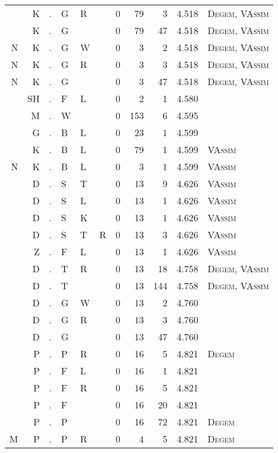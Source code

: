 \begin{longtable}{r@{ } r@{ } c@{ } l@{ } l@{ } l@{ } r r r r l }
  & K & . & G & R &   & 0 & 79 & 3 & 4.518 & \textsc{Degem}, \textsc{VAssim} \\
  & K & . & G &   &   & 0 & 79 & 47 & 4.518 & \textsc{Degem}, \textsc{VAssim} \\
N & K & . & G & W &   & 0 & 3 & 2 & 4.518 & \textsc{Degem}, \textsc{VAssim} \\
N & K & . & G & R &   & 0 & 3 & 3 & 4.518 & \textsc{Degem}, \textsc{VAssim} \\
N & K & . & G &   &   & 0 & 3 & 47 & 4.518 & \textsc{Degem}, \textsc{VAssim} \\
  & SH & . & F & L &   & 0 & 2 & 1 & 4.580 &  \\
  & M & . & W &   &   & 0 & 153 & 6 & 4.595 &  \\
  & G & . & B & L &   & 0 & 23 & 1 & 4.599 &  \\
  & K & . & B & L &   & 0 & 79 & 1 & 4.599 & \textsc{VAssim} \\
N & K & . & B & L &   & 0 & 3 & 1 & 4.599 & \textsc{VAssim} \\
  & D & . & S & T &   & 0 & 13 & 9 & 4.626 & \textsc{VAssim} \\
  & D & . & S & L &   & 0 & 13 & 1 & 4.626 & \textsc{VAssim} \\
  & D & . & S & K &   & 0 & 13 & 1 & 4.626 & \textsc{VAssim} \\
  & D & . & S & T & R & 0 & 13 & 3 & 4.626 & \textsc{VAssim} \\
  & Z & . & F & L &   & 0 & 13 & 1 & 4.626 & \textsc{VAssim} \\
  & D & . & T & R &   & 0 & 13 & 18 & 4.758 & \textsc{Degem}, \textsc{VAssim} \\
  & D & . & T &   &   & 0 & 13 & 144 & 4.758 & \textsc{Degem}, \textsc{VAssim} \\
  & D & . & G & W &   & 0 & 13 & 2 & 4.760 &  \\
  & D & . & G & R &   & 0 & 13 & 3 & 4.760 &  \\
  & D & . & G &   &   & 0 & 13 & 47 & 4.760 &  \\
  & P & . & P & R &   & 0 & 16 & 5 & 4.821 & \textsc{Degem} \\
  & P & . & F & L &   & 0 & 16 & 1 & 4.821 &  \\
  & P & . & F & R &   & 0 & 16 & 5 & 4.821 &  \\
  & P & . & F &   &   & 0 & 16 & 20 & 4.821 &  \\
  & P & . & P &   &   & 0 & 16 & 72 & 4.821 & \textsc{Degem} \\
M & P & . & P & R &   & 0 & 4 & 5 & 4.821 & \textsc{Degem} \\

\end{longtable}
